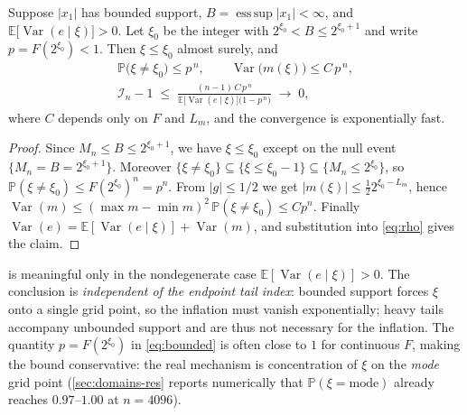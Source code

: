 \documentclass[review,hidelinks,oneeqnum,onetabnum,onefignum,onethmnum]{siamart251216}
\begin{document}
\begin{proposition}
\label{prop:bound}
Suppose $|x_1|$ has bounded support, $B=\operatorname{ess\,sup}|x_1|<\infty$,
and $\mathbb{E}\bigl[\operatorname{Var}(e\mid\xi)\bigr]>0$. Let $\xi_0$ be the
integer with $2^{\xi_0}<B\le2^{\xi_0+1}$ and write $p=F(2^{\xi_0})<1$. Then
$\xi\le\xi_0$ almost surely, and
\begin{equation}
\begin{gathered}
\mathbb{P}\bigl(\xi\ne\xi_0\bigr)\le p^{\,n},
\qquad
\operatorname{Var}\bigl(m(\xi)\bigr)\le C\,p^{\,n},\\
\mathcal I_n-1\;\le\;\frac{(n-1)\,C\,p^{\,n}}{\mathbb{E}\bigl[\operatorname{Var}(e\mid\xi)\bigr]\bigl(1-p^{\,n}\bigr)}\;\longrightarrow\;0 ,
\end{gathered}
\label{eq:bounded}
\end{equation}
where $C$ depends only on $F$ and $L_m$, and the convergence is exponentially
fast.
\end{proposition}

\begin{proof}
Since $M_n\le B\le2^{\xi_0+1}$, we have $\xi\le\xi_0$ except on the
null event $\{M_n=B=2^{\xi_0+1}\}$. Moreover
$\{\xi\ne\xi_0\}\subseteq\{\xi\le\xi_0-1\}\subseteq\{M_n\le2^{\xi_0}\}$, so
$\mathbb{P}(\xi\ne\xi_0)\le F(2^{\xi_0})^n=p^n$. From $|g|\le1/2$ we get
$|m(\xi)|\le\tfrac122^{\xi_0-L_m}$, hence
$\operatorname{Var}(m)\le(\max m-\min m)^2\,\mathbb{P}(\xi\ne\xi_0)\le Cp^n$.
Finally $\operatorname{Var}(e)=\mathbb{E}[\operatorname{Var}(e\mid\xi)]+\operatorname{Var}(m)$,
and substitution into \cref{eq:rho} gives the claim.
\end{proof}

\begin{remark}
 is meaningful only in the nondegenerate case
$\mathbb{E}[\operatorname{Var}(e\mid\xi)]>0$. The conclusion is \emph{independent
of the endpoint tail index}: bounded support forces $\xi$ onto a single grid
point, so the inflation must vanish exponentially; heavy tails accompany
unbounded support and are thus not necessary for the inflation. The quantity
$p=F(2^{\xi_0})$ in \cref{eq:bounded} is often close to $1$ for continuous $F$,
making the bound conservative: the real mechanism is concentration of $\xi$ on
the \emph{mode} grid point (\cref{sec:domains-res} reports numerically that
$\mathbb{P}(\xi=\text{mode})$ already reaches $0.97$--$1.00$ at $n=4096$).
\end{remark}
\end{document}
